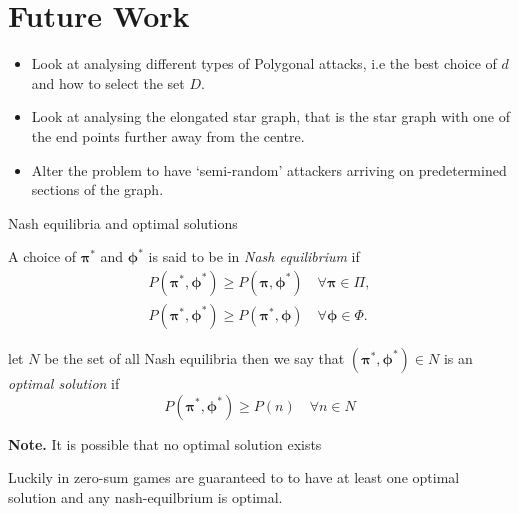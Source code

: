 \documentclass[11pt]{beamer}
\begin{document}
\section[]{Future Work}
\hypertarget{Future work}{}
\begin{frame}{\insertsection}

\begin{itemize}
\item Look at analysing different types of Polygonal attacks, i.e the best choice of $d$ and how to select the set $D$.
\item Look at analysing the elongated star graph, that is the star graph with one of the end points further away from the centre.
\item Alter the problem to have `semi-random' attackers arriving on predetermined sections of the graph.
\end{itemize}

\end{frame}



\begin{frame}{Nash equilibria and optimal solutions}
\begin{definition}
A choice of $\bm{\pi}^*$ and $\bm{\phi}^*$ is said to be in \textit{Nash equilibrium} if 
\begin{align*}
P(\bm{\pi}^*,\bm{\phi}^*) \geq P(\bm{\pi},\bm{\phi}^*) \quad \forall \bm{\pi} \in \Pi , \\
P(\bm{\pi}^*,\bm{\phi}^*) \geq P(\bm{\pi}^*,\bm{\phi}) \quad \forall \bm{\phi} \in \Phi .
\end{align*}
\end{definition}

\pause

\begin{definition}
let $N$ be the set of all Nash equilibria then we say that $(\bm{\pi}^{*},\bm{\phi}^{*}) \in N$ is an \textit{optimal solution} if
$$P(\bm{\pi}^{*},\bm{\phi}^{*}) \geq P(n) \quad \forall n \in N$$ 
\end{definition}

\textbf{Note.} It is possible that no optimal solution exists

\pause

Luckily in zero-sum games are guaranteed to to have at least one optimal solution and any nash-equilbrium is optimal.

\end{frame}
\end{document}
